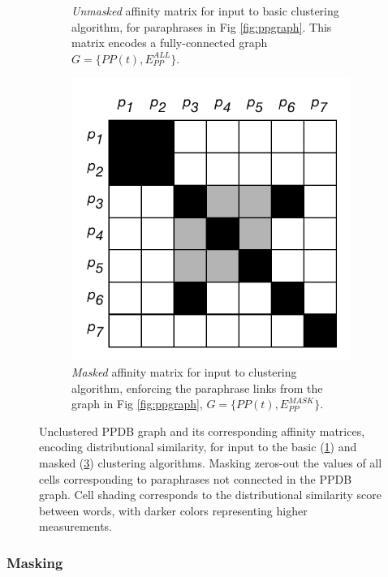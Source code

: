 \documentclass[11pt]{article}
\begin{document}
\begin{figure}
\begin{subfigure}[t]{0.36\textwidth}
			\caption{\textit{Unmasked} affinity matrix for input to basic clustering algorithm, for paraphrases in Fig \ref{fig:ppgraph}. This matrix encodes a fully-connected graph $G = \{PP(t), E_{PP}^{ALL}\}$.}
			\label{fig:ppmatall}
		\end{subfigure}
		\hfill%
		\begin{subfigure}[t]{0.36\textwidth}
			\includegraphics[width=\textwidth]{images/pp_mat_mask.pdf}
			\caption{\textit{Masked} affinity matrix for input to clustering algorithm, enforcing the paraphrase links from the graph in Fig \ref{fig:ppgraph}, $G = \{PP(t), E_{PP}^{MASK}\}$.}
			\label{fig:ppmatmask}
		\end{subfigure}
		\caption{Unclustered PPDB graph and its corresponding affinity matrices, encoding distributional similarity, for input to the basic (\ref{fig:ppmatall}) and masked (\ref{fig:ppmatmask}) clustering algorithms. Masking zeros-out the values of all cells corresponding to paraphrases not connected in the PPDB graph. Cell shading corresponds to the distributional similarity score between words, with darker colors representing higher measurements. }
	\end{figure}
	
	\subsubsection{Masking}
	
\end{document}
